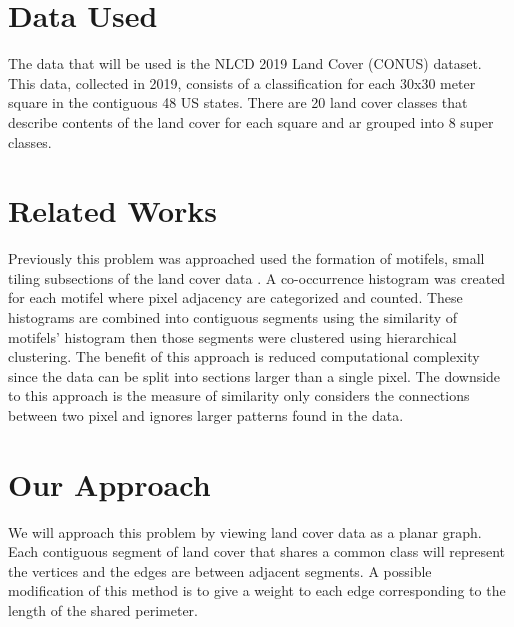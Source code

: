 \documentclass[journal,compsoc]{IEEEtran}
\begin{document}
\section{Data Used}
The data that will be used is the NLCD 2019 Land Cover (CONUS) dataset. This data, collected in
2019, consists of a classification for each 30x30 meter square in the contiguous 48 US states.
There are 20 land cover classes that describe contents of the land cover for each square and ar grouped into 8 super classes. \cite{NLCD2019LandCover}

\section{Related Works}
Previously this problem was approached used the formation of motifels, small tiling subsections of the land cover data \cite{doi:10.1080/13658816.2015.1134796}. A co-occurrence histogram was created for each motifel where pixel adjacency are categorized and counted. These histograms are combined into contiguous segments using the similarity of motifels' histogram then those segments were clustered using hierarchical clustering. The benefit of this approach is reduced computational complexity since the data can be split into sections larger than a single pixel. The downside to this approach is the measure of similarity only considers the connections between two pixel and ignores larger patterns found in the data.


\section{Our Approach}
We will approach this problem by viewing land cover data as a planar graph. Each contiguous segment of land cover that shares a common class will represent the vertices and the edges are between adjacent segments. A possible modification of this method is to give a weight to each edge corresponding to the length of the shared perimeter. 
\end{document}
